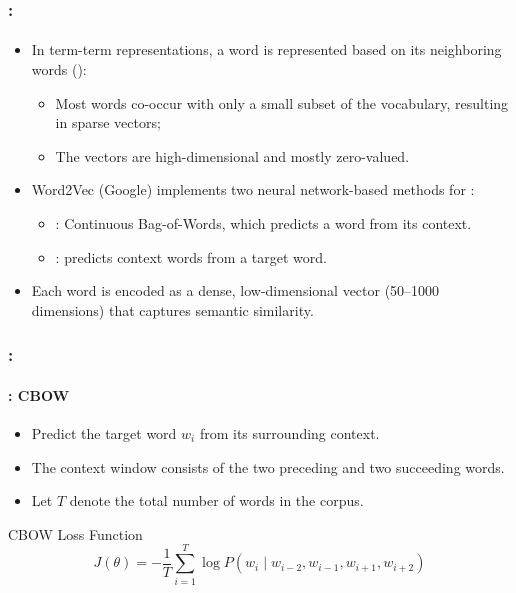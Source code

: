 \documentclass[xcolor=table]{beamer}
\begin{document}
\begin{frame}
	\frametitle{\insertshortsubtitle: \insertsection}
	\framesubtitle{\insertsubsection}
	
	\begin{itemize}
		\item In term-term representations, a word is represented based on its neighboring words ():
		\begin{itemize}
			\item Most words co-occur with only a small subset of the vocabulary, resulting in sparse vectors;
			\item The vectors are high-dimensional and mostly zero-valued.
		\end{itemize}
		\item Word2Vec (Google) implements two neural network-based methods for  \cite{2013-mikolov-al}:
		\begin{itemize}
			\item {}: Continuous Bag-of-Words, which predicts a word from its context.
			\item {}: predicts context words from a target word.
		\end{itemize}
		\item Each word is encoded as a dense, low-dimensional vector (50–1000 dimensions) that captures semantic similarity.
	\end{itemize}
	

\end{frame}

\begin{frame}
	\frametitle{\insertshortsubtitle: \insertsection}
	\framesubtitle{\insertsubsection: CBOW}
	
	\begin{minipage}{.63\textwidth}
		
		\begin{itemize}
			\item Predict the target word $w_i$ from its surrounding context.
			\item The context window consists of the two preceding and two succeeding words.
			\item Let $T$ denote the total number of words in the corpus.
		\end{itemize}
		
		\begin{block}{CBOW Loss Function}
			\[
			J(\theta) = -\frac{1}{T} \sum_{i=1}^{T} \log P(w_i \mid w_{i-2}, w_{i-1}, w_{i+1}, w_{i+2})
			\]
		\end{block}
		
	\end{minipage}
	\begin{minipage}{.36\textwidth}
	\end{minipage}
	
\end{frame}
\end{document}
